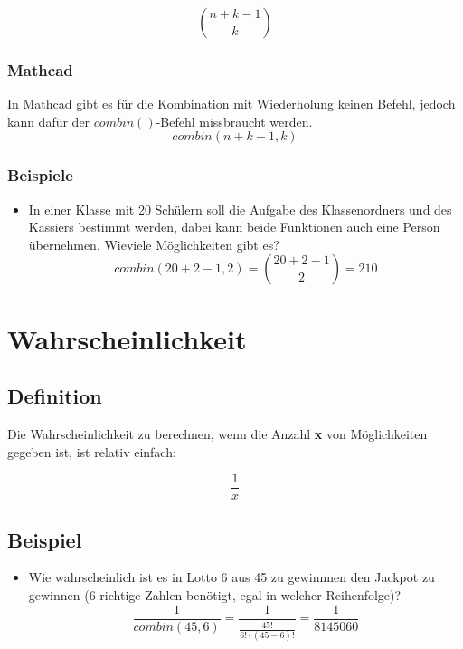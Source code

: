 \documentclass[a4paper,10pt]{article}
\begin{document}
\begin{equation}
  \label{eq:15}
  \binom{n + k - 1}{k}
\end{equation}

\subsubsection{Mathcad}
In Mathcad gibt es für die Kombination mit Wiederholung keinen Befehl,
jedoch kann dafür der $combin()$-Befehl missbraucht werden.
\begin{equation}
  \label{eq:16}
  combin(n + k - 1, k)
\end{equation}

\subsubsection{Beispiele}
\begin{itemize}
\item {
    In einer Klasse mit 20 Schülern soll die Aufgabe des
    Klassenordners und des Kassiers bestimmt werden, dabei kann beide
    Funktionen auch eine Person übernehmen. Wieviele Möglichkeiten
    gibt es?
    \begin{equation}
      \label{eq:17}
      combin(20 + 2 - 1, 2) = \binom{20 + 2 - 1}{2} = 210
    \end{equation}
  }
\end{itemize}

\section{Wahrscheinlichkeit}
\subsection{Definition}
Die Wahrscheinlichkeit zu berechnen, wenn die Anzahl \textbf{x} von
Möglichkeiten gegeben ist, ist relativ einfach:

\begin{equation}
  \label{eq:9}
  \frac{1}{x}
\end{equation}

\subsection{Beispiel}
\begin{itemize}
\item {
    Wie wahrscheinlich ist es in Lotto 6 aus 45 zu gewinnnen den
    Jackpot zu gewinnen (6 richtige Zahlen benötigt, egal in welcher
    Reihenfolge)?
    \begin{equation}
      \label{eq:10}
      \frac{1}{combin(45, 6)} = \frac{1}{\frac{45!}{6! \cdot (45 - 6)!}} = \frac{1}{8145060}
    \end{equation}
  }
\end{itemize}
\end{document}
